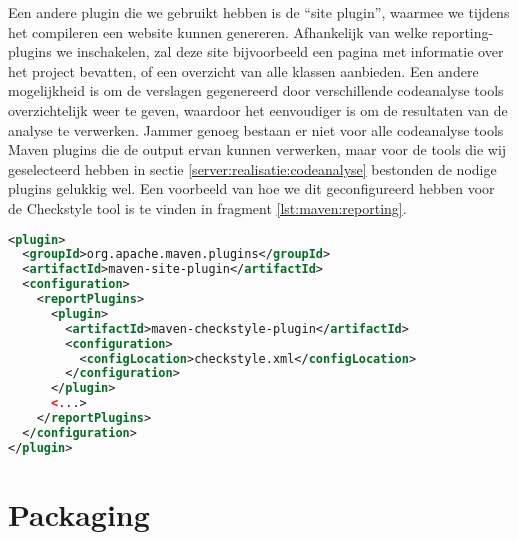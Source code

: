 Een andere plugin die we gebruikt hebben is de ``site plugin'', waarmee we tijdens het compileren een website kunnen genereren. Afhankelijk van welke reporting-plugins we inschakelen, zal deze site bijvoorbeeld een pagina met informatie over het project bevatten, of een overzicht van alle klassen aanbieden. Een andere mogelijkheid is om de verslagen gegenereerd door verschillende codeanalyse tools overzichtelijk weer te geven, waardoor het eenvoudiger is om de resultaten van de analyse te verwerken. Jammer genoeg bestaan er niet voor alle codeanalyse tools Maven plugins die de output ervan kunnen verwerken, maar voor de tools die wij geselecteerd hebben in sectie \ref{server:realisatie:codeanalyse} bestonden de nodige plugins gelukkig wel. Een voorbeeld van hoe we dit geconfigureerd hebben voor de Checkstyle tool is te vinden in fragment \ref{lst:maven:reporting}.

\begin{lstlisting}[language=XML, float, caption=Configuratie van de Maven site plugin voor het genereren van Checkstyle reports., label=lst:maven:reporting]
<plugin>
  <groupId>org.apache.maven.plugins</groupId>
  <artifactId>maven-site-plugin</artifactId>
  <configuration>
    <reportPlugins>
      <plugin>
        <artifactId>maven-checkstyle-plugin</artifactId>
        <configuration>
          <configLocation>checkstyle.xml</configLocation>
        </configuration>
      </plugin>
      <...>
    </reportPlugins>
  </configuration>
</plugin>
\end{lstlisting}
\section{Packaging}

